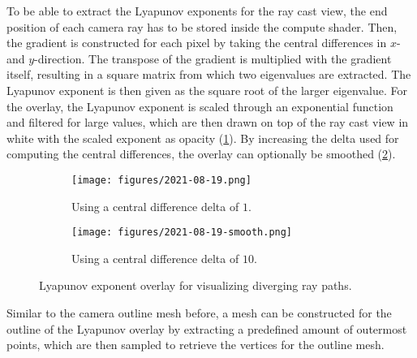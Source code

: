To be able to extract the Lyapunov exponents for the ray cast view, the end position of each camera ray has to be stored inside the compute shader.
Then, the gradient is constructed for each pixel by taking the central differences in $x$- and $y$-direction.
The transpose of the gradient is multiplied with the gradient itself, resulting in a square matrix from which two eigenvalues are extracted.
The Lyapunov exponent is then given as the square root of the larger eigenvalue.
For the overlay, the Lyapunov exponent is scaled through an exponential function and filtered for large values, which are then drawn on top of the ray cast view in white with the scaled exponent as opacity (\cref{fig:lyapunov-exponent-overlay-sharp}).
By increasing the delta used for computing the central differences, the overlay can optionally be smoothed (\cref{fig:lyapunov-exponent-overlay-smooth}).
\begin{figure}[!t]
\centering
\begin{subfigure}{0.48\linewidth}
    \texttt{[image: figures/2021-08-19.png]}
    \caption{Using a central difference delta of $1$.}
    \label{fig:lyapunov-exponent-overlay-sharp}
\end{subfigure}
\begin{subfigure}{0.48\linewidth}
    \texttt{[image: figures/2021-08-19-smooth.png]}
    \caption{Using a central difference delta of $10$.}
    \label{fig:lyapunov-exponent-overlay-smooth}
\end{subfigure}
  \caption{Lyapunov exponent overlay for visualizing diverging ray paths.}
  \label{fig:lyapunov-exponent-overlay}
\end{figure}
Similar to the camera outline mesh before, a mesh can be constructed for the outline of the Lyapunov overlay by extracting a predefined amount of outermost points, which are then sampled to retrieve the vertices for the outline mesh.

